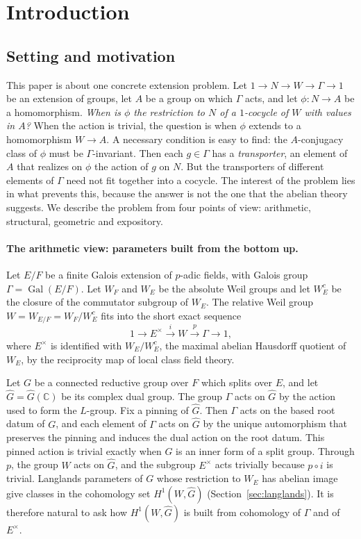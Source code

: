 \documentclass[12pt,letterpaper]{article}
\numberwithin{equation}{section}
\theoremstyle{plain}
\theoremstyle{definition}
\newcommand{\C}{\mathbb{C}}
\newcommand{\Gh}{\widehat{G}}
\DeclareMathOperator{\Gal}{Gal}
\begin{document}
\tableofcontents

\section{Introduction}\label{sec:intro}

\subsection{Setting and motivation}

This paper is about one concrete extension problem. Let
$1\to N\to W\to\Gamma\to1$ be an extension of groups, let $A$ be a group
on which $\Gamma$ acts, and let $\phi:N\to A$ be a homomorphism.
\emph{When is $\phi$ the restriction to $N$ of a $1$-cocycle of $W$ with
values in $A$?} When the action is trivial, the question is when $\phi$
extends to a homomorphism $W\to A$. A necessary condition is easy to
find: the $A$-conjugacy class of $\phi$ must be $\Gamma$-invariant. Then
each $g\in\Gamma$ has a \emph{transporter}, an element of $A$ that
realizes on $\phi$ the action of $g$ on $N$. But the transporters of
different elements of $\Gamma$ need not fit together into a cocycle. The
interest of the problem lies in what prevents this, because the answer
is not the one that the abelian theory suggests. We describe the problem
from four points of view: arithmetic, structural, geometric and
expository.

\paragraph{The arithmetic view: parameters built from the bottom up.}
Let $E/F$ be a finite Galois extension of $p$-adic fields, with Galois
group $\Gamma=\Gal(E/F)$. Let $W_F$ and $W_E$ be the absolute Weil groups
and let $W_E^c$ be the closure of the commutator subgroup of $W_E$. The
relative Weil group $W=W_{E/F}=W_F/W_E^c$ fits into the short exact sequence
\begin{equation}\label{eq:weil}
1\longrightarrow E^{\times}\overset{i}{\longrightarrow} W
\overset{p}{\longrightarrow}\Gamma\longrightarrow 1 ,
\end{equation}
where $E^\times$ is identified with $W_E/W_E^c$, the maximal abelian
Hausdorff quotient of $W_E$, by the reciprocity map of local class field
theory.

Let $G$ be a connected reductive group over $F$ which splits over $E$, and
let $\Gh=\Gh(\C)$ be its complex dual group. The group $\Gamma$ acts on
$\Gh$ by the action used to form the $L$-group. Fix a pinning of $\Gh$.
Then $\Gamma$ acts on the based root datum of $G$, and each element of
$\Gamma$ acts on $\Gh$ by the unique automorphism that preserves the
pinning and induces the dual action on the root datum. This pinned action
is trivial exactly when $G$ is an inner form of a split group. Through $p$, the group $W$ acts on $\Gh$, and the subgroup
$E^\times$ acts trivially because $p\circ i$ is trivial. Langlands
parameters of $G$ whose restriction to $W_E$ has abelian image give classes
in the cohomology set $H^1(W,\Gh)$ (Section~\ref{sec:langlands}). It is
therefore natural to ask how $H^1(W,\Gh)$ is built from cohomology of
$\Gamma$ and of $E^\times$.
\end{document}

